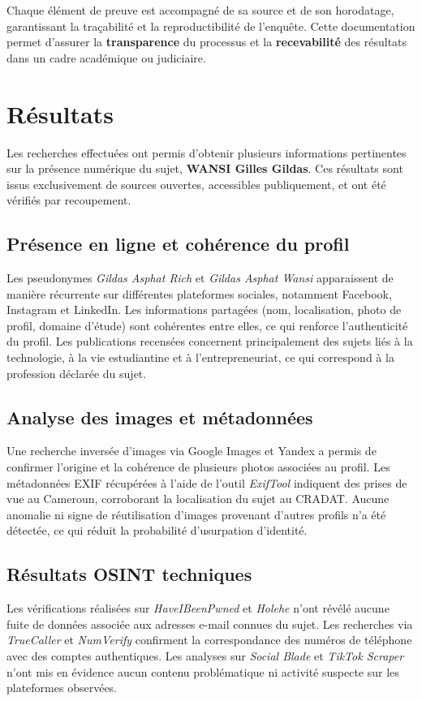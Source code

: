 \documentclass[memoire, 12pt]{report}
\begin{document}
Chaque élément de preuve est accompagné de sa source et de son horodatage, garantissant la traçabilité et la reproductibilité de l’enquête.  
Cette documentation permet d’assurer la \textbf{transparence} du processus et la \textbf{recevabilité} des résultats dans un cadre académique ou judiciaire.
\section{Résultats}
Les recherches effectuées ont permis d’obtenir plusieurs informations pertinentes sur la présence numérique du sujet, \textbf{WANSI Gilles Gildas}. Ces résultats sont issus exclusivement de sources ouvertes, accessibles publiquement, et ont été vérifiés par recoupement.

\subsection*{Présence en ligne et cohérence du profil}
Les pseudonymes \textit{Gildas Asphat Rich} et \textit{Gildas Asphat Wansi} apparaissent de manière récurrente sur différentes plateformes sociales, notamment Facebook, Instagram et LinkedIn. Les informations partagées (nom, localisation, photo de profil, domaine d’étude) sont cohérentes entre elles, ce qui renforce l’authenticité du profil.  
Les publications recensées concernent principalement des sujets liés à la technologie, à la vie estudiantine et à l’entrepreneuriat, ce qui correspond à la profession déclarée du sujet.

\subsection*{Analyse des images et métadonnées}
Une recherche inversée d’images via Google Images et Yandex a permis de confirmer l’origine et la cohérence de plusieurs photos associées au profil. Les métadonnées EXIF récupérées à l’aide de l’outil \textit{ExifTool} indiquent des prises de vue au Cameroun, corroborant la localisation du sujet au CRADAT.  
Aucune anomalie ni signe de réutilisation d’images provenant d’autres profils n’a été détectée, ce qui réduit la probabilité d’usurpation d’identité.

\subsection*{Résultats OSINT techniques}
Les vérifications réalisées sur \textit{HaveIBeenPwned} et \textit{Holehe} n’ont révélé aucune fuite de données associée aux adresses e-mail connues du sujet.  
Les recherches via \textit{TrueCaller} et \textit{NumVerify} confirment la correspondance des numéros de téléphone avec des comptes authentiques.  
Les analyses sur \textit{Social Blade} et \textit{TikTok Scraper} n’ont mis en évidence aucun contenu problématique ni activité suspecte sur les plateformes observées.
\end{document}
